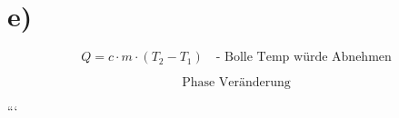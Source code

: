 

\section*{e)}

\[
Q = c \cdot m \cdot (T_2 - T_1) \quad \text{- Bolle Temp würde Abnehmen}
\]

\[
\text{Phase Veränderung}
\]

```